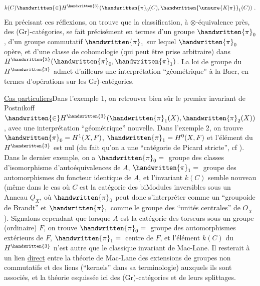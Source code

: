 \[
k(C)\handwritten{\in}H^{\handwritten{3}}(\handwritten{\pi}_{0}(C),\handwritten{\unsure{K|\pi}}_{1}(C))\ .
\]
En précisant ces réflexions, on trouve que la classification, à $\otimes$-équivalence près, des (Gr)-catégories, se fait précisément en termes d'un groupe $\handwritten{\pi}_{0}$, d'un groupe commutatif $\handwritten{\pi}_{1}$ sur lequel $\handwritten{\pi}_{0}$ opère, et d'une classe de cohomologie (qui peut être prise arbitraire) dans $H^{\handwritten{3}}(\handwritten{\pi}_{0},\handwritten{\pi}_{1})$. La loi de  groupe du $H^{\handwritten{3}}$ admet d'ailleurs une interprétation ``géométrique'' à la Baer, en termes d'opérations sur les \handwritten{(}Gr)-catégories.

\uline{Cas particuliers}\quad Dans l'exemple 1, on  retrouver bien sûr le premier invariant de Postnikoff $\handwritten{\in}H^{\handwritten{3}}(\handwritten{\pi}_{1}(X),\handwritten{\pi}_{2}(X))$, avec une interprétation ``géo\deleted{(}métrique'' nouvelle. Dans l'exemple 2, on trouve $\handwritten{\pi}_{0}=H^{1}(X,F)$, $\handwritten{\pi}_{1}=H^{0}(X,F)$\handwritten{,} et l'élément du $H^{\handwritten{3}}$ est nul (du fait qu'on a une ``catégorie de Picard stricte'', cf \handwritten{[\, ]}). Dans  le dernier exemple, on a $\handwritten{\pi}_{0}={}$ groupe des classes d'isomorphisme d'autoéquivalences de $A$, $\handwritten{\pi}_{1}={}$ groupe des automorphismes du foncteur identique de $A$, et l'invariant $k(C)$ semble nouveau (même dans le cas où $C$ est la catégorie des biModules inversibles sous un Anneau $\underline{O}_{X}$, où $\handwritten{\pi}_{0}$ peut donc s'interpréter comme un ``groupoide de Brandt'' et $\handwritten{\pi}_{1}$ comme le groupe des ``unités centrales'' de $\underline{O}_{X}$). Signalons cependant que lorsque $A$ est la catégorie des torseurs sous un groupe (ordinaire) $F$, on trouve  $\handwritten{\pi}_{0}={}$ groupe des automorphismes extérieurs de $F$, $\handwritten{\pi}_{1}={}$ centre de $F$, et l'élément $k(C)$ du $H^{\handwritten{3}}$ n'est autre que le classique invariant de Mac-Lane. Il resterait à  un lien  \uline{direct} entre la théorie de Mac-Lane des extensions de groupes non commutatifs et des liens (``kernels''\deleted{\unsure{)|,}} dans sa terminologie) auxquels ils sont associés, et la théorie  esquissée ici des (Gr)-catégories et de leurs splittages.

